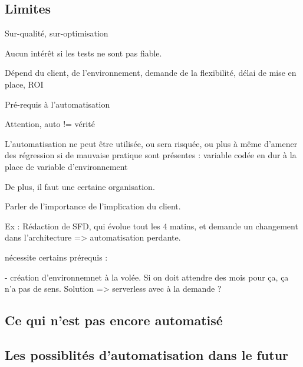\subsection*{Limites}



Sur-qualité, sur-optimisation

Aucun intérêt si les tests ne sont pas fiable.

Dépend du client, de l'environnement, demande de la flexibilité, délai de mise en place, ROI

Pré-requis à l'automatisation

Attention, auto != vérité 

L'automatisation ne peut être utilisée, ou sera risquée, ou plus à même d'amener des régression si de mauvaise pratique sont présentes : variable codée en dur à la place de variable d'environnement

De plus, il faut une certaine organisation.

Parler de l'importance de l'implication du client. 

Ex :  Rédaction de SFD, qui évolue tout les 4 matins, et demande un changement dans l'architecture => automatisation perdante.

nécessite certains prérequis : 

- création d'environnemnet à la volée. Si on doit attendre des mois pour ça, ça n'a pas de sens. Solution => serverless avec à la demande ? 

\subsection*{Ce qui n'est pas encore automatisé}


\subsection*{Les possiblités d'automatisation dans le futur}




